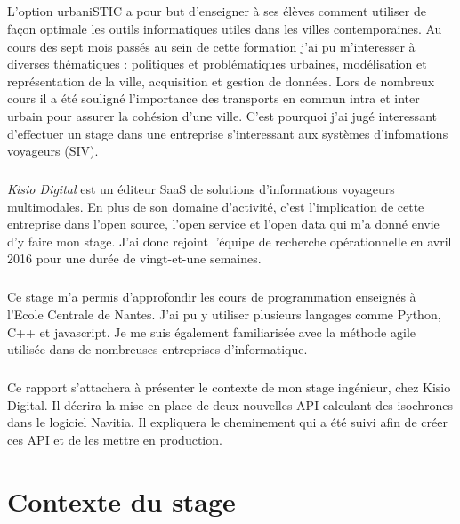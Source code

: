 \documentclass[a4paper]{report}
\begin{document}
\paragraph{} L'option urbaniSTIC a pour but d'enseigner à ses élèves comment utiliser de façon optimale les outils informatiques utiles dans les villes contemporaines. Au cours des sept mois passés au sein de cette formation j'ai pu m'interesser à diverses thématiques : politiques et problématiques urbaines, modélisation et représentation de la ville, acquisition et gestion de données. Lors de nombreux cours il a été souligné l'importance des transports en commun intra et inter urbain pour assurer la cohésion d'une ville. C'est pourquoi j'ai jugé interessant d'effectuer un stage dans une entreprise s'interessant aux systèmes d'infomations voyageurs (SIV).

\paragraph{} \emph{Kisio Digital} est un éditeur SaaS de solutions d’informations voyageurs multimodales. En plus de son domaine d'activité, c'est l'implication de cette entreprise dans l'open source, l'open service et l'open data qui m'a donné envie d'y faire mon stage. J'ai donc rejoint l'équipe de recherche opérationnelle en avril 2016 pour une durée de vingt-et-une semaines.

\paragraph{} Ce stage m'a permis d'approfondir les cours de programmation enseignés à l'Ecole Centrale de Nantes. J'ai pu y utiliser plusieurs langages comme Python, C++ et javascript. Je me suis également familiarisée avec la méthode agile utilisée dans de nombreuses entreprises d'informatique. 

\paragraph{} Ce rapport s’attachera  à présenter le contexte de mon stage ingénieur, chez Kisio Digital. Il décrira la mise en place de deux nouvelles API calculant des isochrones dans le logiciel Navitia. Il expliquera le cheminement qui a été suivi afin de créer ces API et de les mettre en production.

\chapter{Contexte du stage}
\end{document}
